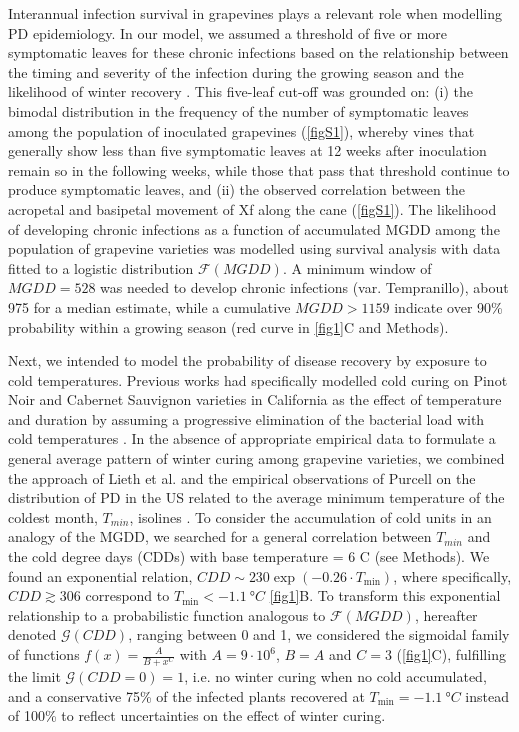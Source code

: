 Interannual infection survival in grapevines plays a relevant role when
modelling PD epidemiology. In our model, we assumed a threshold of five or more
symptomatic leaves for these chronic infections based on the relationship
between the timing and severity of the infection during the growing season and
the likelihood of winter recovery  \cite{Feil2001, Feil2003, Lieth2011}. This
five-leaf cut-off was grounded on: (i) the bimodal distribution in the
frequency of the number of symptomatic leaves among the population of
inoculated grapevines (\cref{figS1}), whereby vines that generally show less
than five symptomatic leaves at 12 weeks after inoculation remain so in the
following weeks, while those that pass that threshold continue to produce
symptomatic leaves, and (ii) the observed correlation between the acropetal and
basipetal movement of Xf along the cane (\cref{figS1}). The likelihood of
developing chronic infections as a function of accumulated MGDD among the
population of grapevine varieties was modelled using survival analysis with
data fitted to a logistic distribution $\mathcal{F}(MGDD)$. A minimum window of
$MGDD=528$ was needed to develop chronic infections (var. Tempranillo), about
975 for a median estimate, while a cumulative $MGDD>1159$ indicate over 90\%
probability within a growing season (red curve in \cref{fig1}C and Methods).

Next, we intended to model the probability of disease recovery by exposure to
cold temperatures. Previous works had specifically modelled cold curing on
Pinot Noir and Cabernet Sauvignon varieties in California as the effect of
temperature and duration \cite{Lieth2011} by assuming a progressive elimination
of the bacterial load with cold temperatures \cite{Feil2003}. In the absence of
appropriate empirical data to formulate a general average pattern of winter
curing among grapevine varieties, we combined the approach of Lieth et al.
\cite{Lieth2011} and the empirical observations of Purcell on the distribution
of PD in the US related to the average minimum temperature of the coldest
month, $T_{min}$, isolines \cite{Anas2008}. To consider
the accumulation of cold units in an analogy of the MGDD, we searched for a
general correlation between $T_{min}$ and the cold degree days (CDDs) with base
temperature = $6$ \textdegree C (see Methods). We found an exponential
relation, $CDD \sim 230\exp(-0.26\cdot T_{\textrm{min}})$, where specifically,
$CDD\gtrsim306$ correspond to $T_{\textrm{min}}<\SI{-1.1}{\degree C}$
\cref{fig1}B. To transform this exponential relationship to a probabilistic
function analogous to $\mathcal{F}(MGDD)$, hereafter denoted
$\mathcal{G}(CDD)$, ranging between 0 and 1, we considered the sigmoidal family
of functions $\displaystyle f(x)=\frac{A}{B+x^C}$ with $A=9\cdot 10^6$, $B=A$
and $C=3$ (\cref{fig1}C), fulfilling the limit $\mathcal{G}(CDD=0)=1$, i.e. no
winter curing when no cold accumulated, and a conservative 75\% of the infected
plants recovered at $T_{\textrm{min}}=\SI{-1.1}{\degree C}$ instead of 100\% to
reflect uncertainties on the effect of winter curing.

